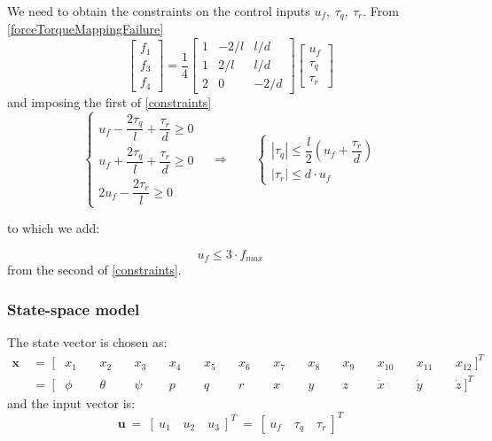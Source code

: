 \documentclass[11pt,a4paper]{scrartcl}
\begin{document}
We need to obtain the constraints on the control inputs $ u_f, \ \tau_q, \ \tau_r $. From \eqref{forceTorqueMappingFailure}
\begin{equation}
	\begin{bmatrix}
	f_1 \\ f_3 \\ f_4
	\end{bmatrix} = \frac{1}{4} 
	\begin{bmatrix}
	1 & -2/l & l/d \\
	1 & 2/l & l/d \\
	2 & 0 & -2/d
	\end{bmatrix}
	\begin{bmatrix}
	u_f \\ \tau_q \\ \tau_r
	\end{bmatrix}
\end{equation}
and imposing the first of \eqref{constraints}  
\begin{equation}
	\begin{cases}
	u_f - \dfrac{2 \tau_q}{l} + \dfrac{\tau_r}{d} \geq 0 \\
	u_f + \dfrac{2 \tau_q}{l} + \dfrac{\tau_r}{d} \geq 0 \\
	2 u_f - \dfrac{2 \tau_r}{l} \geq 0
	\end{cases} \quad
	\Rightarrow \qquad
	\begin{cases}
	|\tau_q| \leq \dfrac{l}{2}(u_f + \dfrac{\tau_r}{d}) \\
	|\tau_r| \leq d\cdot u_f
	\end{cases}
\end{equation}

to which we add:

\begin{equation}
	u_f \leq 3 \cdot f_{max}
\end{equation}
from the second of \eqref{constraints}.

\subsubsection{State-space model}

The state vector is chosen as:
\begin{align*}
	\mathbf{x} \ &= \ [&x_1 &\ &x_2 &\ &x_3 &\ &x_4 &\ &x_5 &\ &x_6 &\ &x_7 &\ &x_8 &\ &x_9 &\ &x_{10} &\ &x_{11} &\ &x_{12} \ ]^T \\
	&= \ [&\phi &\ &\theta &\ &\psi &\ &p &\ &q &\ &r &\ &x &\ &y &\ &z &\ &\dot{x} &\ &\dot{y} &\ &\dot{z} \ ]^T
\end{align*}
and the input vector is:
\begin{equation}
	\mathbf{u} \ = \ [ \ u_1 \quad u_2 \quad u_3 \ ]^T \ = \ [ \ u_f \quad \tau_q \quad \tau_r \ ]^T
\end{equation}
\end{document}
